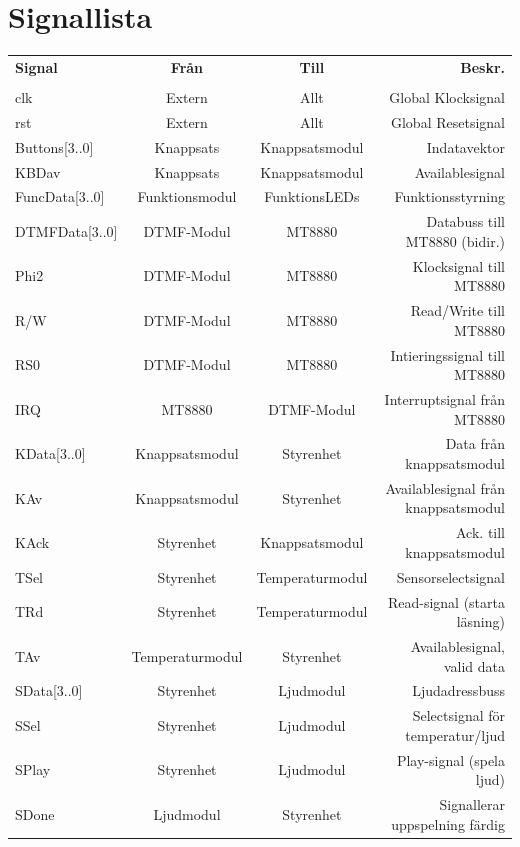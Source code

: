 \documentclass[a4paper,11pt]{article}
\begin{document}
	\section{Signallista}
	\begin{tabular}{l c c r}
		\\{\bf Signal} & {\bf Från} & {\bf Till} & {\bf Beskr.}\\ \\
		clk & Extern & Allt & Global Klocksignal\\
		rst & Extern & Allt & Global Resetsignal\\
		Buttons[3..0] & Knappsats & Knappsatsmodul & Indatavektor\\
		KBDav & Knappsats & Knappsatsmodul & Availablesignal\\
		FuncData[3..0] & Funktionsmodul & FunktionsLEDs & Funktionsstyrning\\
		DTMFData[3..0] & DTMF-Modul & MT8880 & Databuss till MT8880 (bidir.)\\
		Phi2 & DTMF-Modul & MT8880 & Klocksignal till MT8880\\
		R/W & DTMF-Modul & MT8880 & Read/Write till MT8880\\
		RS0 & DTMF-Modul & MT8880 & Intieringssignal till MT8880\\
		IRQ & MT8880 & DTMF-Modul & Interruptsignal från MT8880\\

		KData[3..0] & Knappsatsmodul & Styrenhet & Data från knappsatsmodul\\
		KAv & Knappsatsmodul & Styrenhet & Availablesignal från knappsatsmodul\\
		KAck & Styrenhet & Knappsatsmodul & Ack. till knappsatsmodul\\

		TSel & Styrenhet & Temperaturmodul & Sensorselectsignal\\
		TRd & Styrenhet & Temperaturmodul & Read-signal (starta läsning)\\
		TAv & Temperaturmodul & Styrenhet & Availablesignal, valid data\\

		SData[3..0] & Styrenhet & Ljudmodul & Ljudadressbuss\\
		SSel & Styrenhet & Ljudmodul & Selectsignal för temperatur/ljud\\
		SPlay & Styrenhet & Ljudmodul & Play-signal (spela ljud)\\
		SDone & Ljudmodul & Styrenhet & Signallerar uppspelning färdig\\


\end{tabular}
\end{document}
